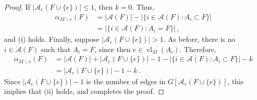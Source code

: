 \documentclass[10pt,a4paper]{amsart}
\DeclareMathOperator{\cl}{cl}
\begin{document}
\begin{proof}
If $|\mathcal A_e(F \cup \{e\})| \leq 1$, then $k = 0$. Thus,
\begin{align*}
\alpha_{M \backslash e}(F) &= |\mathcal A(F)| - |\{i \in \mathcal A(F) : A_i \subset F\}| \\
&= |\{i \in \mathcal A(F) : A_i = F\}| \,,
\end{align*}
and (i) holds. Finally, suppose $|\mathcal A_e(F \cup \{e\})| > 1$. As before, there is no $i \in \mathcal A(F)$ such that $A_i = F$, since then $e \in \cl_M(A_i)$. Therefore,
\begin{align*}
\alpha_{M \backslash e}(F) &= |\mathcal A(F)| + |\mathcal A_e(F \cup \{e\})| - 1 - |\{i \in \mathcal A(F) : A_i \subset F\}| - k \\
&= |\mathcal A_e(F \cup \{e\})| - 1 - k \,.
\end{align*}
Since $|\mathcal A_e(F \cup \{e\})| - 1$ is the number of edges in $G[\mathcal A_e(F \cup \{e\})]$, this implies that (ii) holds, and completes the proof.
\end{proof}
\end{document}
